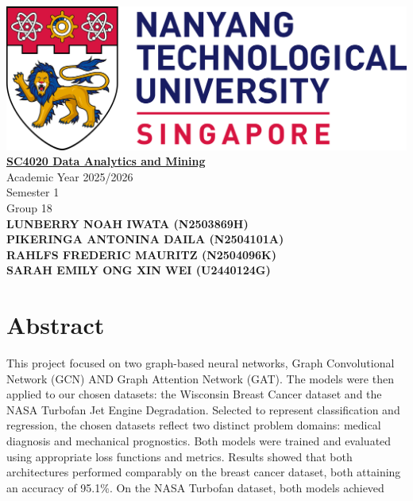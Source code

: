 \documentclass[12pt]{article}
\begin{document}
\begin{center}
    \includegraphics[width=\linewidth]{NTU_Logo.png}
    \\[1cm]
    \underline{\textbf{SC4020 Data Analytics and Mining}}
    \\[1.5em]
    Academic Year 2025/2026
    \\[1em]
    Semester 1
    \\[2em]
    Group 18
    \\[5em]
    \textbf{
        LUNBERRY NOAH IWATA (N2503869H) \\[1em]
        PIKERINGA ANTONINA DAILA (N2504101A) \\[1em]
        RAHLFS FREDERIC MAURITZ (N2504096K) \\[1em]
        SARAH EMILY ONG XIN WEI (U2440124G) \\[1em]
        }
\end{center}
\pagebreak

\justifying

\pagestyle{fancy}
\fancyhf{}  %
\fancyhead[R]{\textcolor{gray}{\nouppercase{\leftmark}}}   %
\fancyfoot[C]{\thepage}  %


\section*{Abstract}

This project focused on two graph-based neural networks, Graph Convolutional Network (GCN) AND Graph Attention Network (GAT). The models were then applied to our chosen datasets: the Wisconsin Breast Cancer dataset and the NASA Turbofan Jet Engine Degradation. Selected to represent classification and regression, the chosen datasets reflect two distinct problem domains: medical diagnosis and mechanical prognostics. Both models were trained and evaluated using appropriate loss functions and metrics. Results showed that both architectures performed comparably on the breast cancer dataset, both attaining an accuracy of 95.1\%. On the NASA Turbofan dataset, both models achieved 
\end{document}
